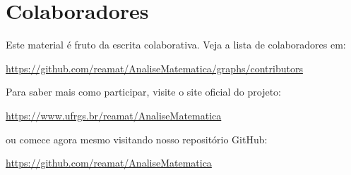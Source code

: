 
\chapter*{Colaboradores}

Este material é fruto da escrita colaborativa. Veja a lista de colaboradores em:
\begin{center}
  \url{https://github.com/reamat/AnaliseMatematica/graphs/contributors}
\end{center}

Para saber mais como participar, visite o site oficial do projeto:
\begin{center}
  \url{https://www.ufrgs.br/reamat/AnaliseMatematica}
\end{center}
ou comece agora mesmo visitando nosso repositório GitHub:
\begin{center}
  \url{https://github.com/reamat/AnaliseMatematica}
\end{center}